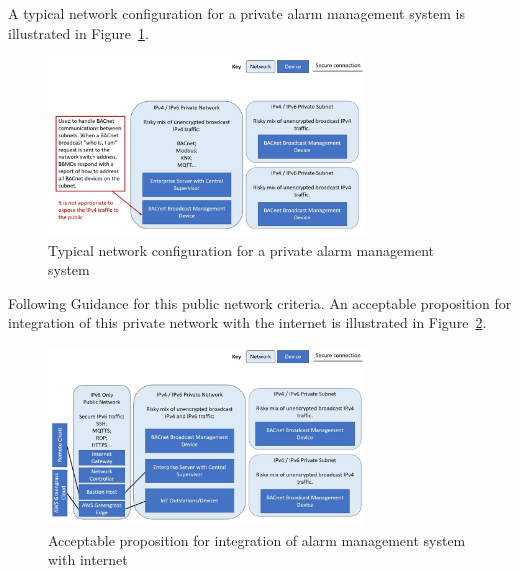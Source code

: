 \documentclass[11pt, oneside]{article}   	%
\begin{document}
A typical network configuration for a private alarm management system is illustrated in Figure~\ref{Typical Network Configuration figure}.

\begin{figure}[h]
\begin{center}
\includegraphics[width=0.75\textwidth]{typicalPrivateNetwork.jpg}
\caption{Typical network configuration for a private alarm management system}
\label{Typical Network Configuration figure}
\end{center}
\end{figure}

Following Guidance for this public network criteria.
An acceptable proposition for integration of this private network with the internet is illustrated in Figure~\ref{Integrated Network Configuration figure}.

\begin{figure}[h]
\begin{center}
\includegraphics[width=0.75\textwidth]{acceptablePublicNetwork.jpg}
\caption{Acceptable proposition for integration of alarm management system with internet}
\label{Integrated Network Configuration figure}
\end{center}
\end{figure}
\end{document}
